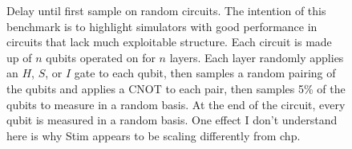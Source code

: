 \documentclass[onecolumn,unpublished]{quantumarticle}
\theoremstyle{definition}
\theoremstyle{definition}
\theoremstyle{definition}
\begin{document}
\begin{figure}
    \centering
    \caption{
        Delay until first sample on random circuits.
        The intention of this benchmark is to highlight simulators with good performance in circuits that lack much exploitable structure.
        Each circuit is made up of $n$ qubits operated on for $n$ layers.
        Each layer randomly applies an $H$, $S$, or $I$ gate to each qubit, then samples a random pairing of the qubits and applies a CNOT to each pair, then samples 5\% of the qubits to measure in a random basis.
        At the end of the circuit, every qubit is measured in a random basis.
        One effect I don't understand here is why Stim appears to be scaling differently from chp.
    }
    \label{fig:bench-random}
\end{figure}
\end{document}
